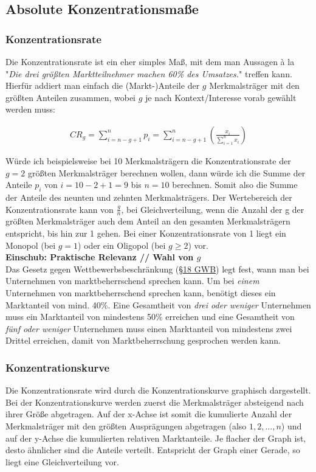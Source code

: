 \documentclass[a4paper]{article}
\begin{document}
\subsection{Absolute Konzentrationsmaße}\label{sec:abs-konz}

\subsubsection{Konzentrationsrate} \label{sec:konz-rate}
Die Konzentrationsrate ist ein eher simples Maß, mit dem man Aussagen à la "\textit{Die drei größten Marktteilnehmer machen 60\% des Umsatzes.}" treffen kann. Hierfür addiert man einfach die (Markt-)Anteile der $g$ Merkmalsträger mit den größten Anteilen zusammen, wobei $g$ je nach Kontext/Interesse vorab gewählt werden muss:

\begin{align*}
    CR_g = \sum_{i=n-g+1}^n p_i = \sum_{i=n-g+1}^n (\frac{x_i}{\sum_{i=1}^n x_i})
\end{align*}

\noindent Würde ich beispielsweise bei 10 Merkmalsträgern die Konzentrationsrate der $g = 2$ größten Merkmalsträger berechnen wollen, dann würde ich die Summe der Anteile $p_i$ von $i=10-2+1=9$ bis $n=10$ berechnen. Somit also die Summe der Anteile des neunten und zehnten Merkmalsträgers.
Der Wertebereich der Konzentrationsrate kann von $\frac{g}{n}$, bei Gleichverteilung, wenn die Anzahl der g der größten Merkmalsträger auch dem Anteil an den gesamten Merkmalsträgern entspricht, bis hin zur 1 gehen. Bei einer Konzentrationsrate von 1 liegt ein Monopol (bei $g = 1$) oder ein Oligopol (bei $g \geq 2$) vor.\\

\noindent \textbf{Einschub: Praktische Relevanz // Wahl von $g$}\\
Das Gesetz gegen Wettbewerbsbeschränkung (\href{https://dejure.org/gesetze/GWB/18.html}{§18 GWB}) legt fest, wann man bei Unternehmen von marktbeherrschend sprechen kann. Um bei \textit{einem} Unternehmen von marktbeherrschend sprechen kann, benötigt dieses ein Marktanteil von mind. 40\%. Eine Gesamtheit von \textit{drei oder weniger} Unternehmen muss ein Marktanteil von mindestens 50\% erreichen und eine Gesamtheit von \textit{fünf oder weniger} Unternehmen muss einen Marktanteil von mindestens zwei Drittel erreichen, damit von Marktbeherrschung gesprochen werden kann.

\subsubsection{Konzentrationskurve}
Die Konzentrationsrate wird durch die Konzentrationskurve graphisch dargestellt. Bei der Konzentrationskurve werden zuerst die Merkmalsträger absteigend nach ihrer Größe abgetragen. Auf der x-Achse ist somit die kumulierte Anzahl der Merkmalsträger mit den größten Ausprägungen abgetragen (also $1, 2, \hdots, n$) und auf der y-Achse die kumulierten relativen Marktanteile. Je flacher der Graph ist, desto ähnlicher sind die Anteile verteilt. Entspricht der Graph einer Gerade, so liegt eine Gleichverteilung vor. 
\end{document}

